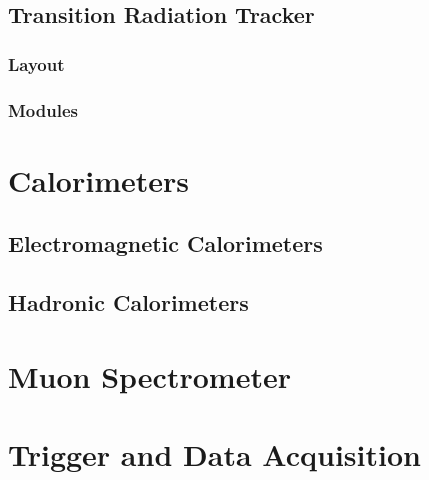 \subsection{Transition Radiation Tracker}\label{subsec:trt}

\subsubsection{Layout}
\subsubsection{Modules}

\section{Calorimeters}\label{sec:calorimeters}
\subsection{Electromagnetic Calorimeters}\label{subsec:em_cal}
\subsection{Hadronic Calorimeters}\label{subsec:had_cal}
\section{Muon Spectrometer}\label{sec:muon_spec}
\section{Trigger and Data Acquisition}\label{sec:trigger}